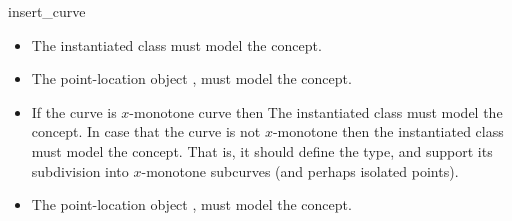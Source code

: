 \begin{ccRefFunction}{insert_curve}
\ccRequirements
\begin{itemize}
\item The instantiated  class must model the
   concept.
\item The point-location object , must model the
   concept.
\end{itemize}
			

\ccRequirements
\begin{itemize}
\item If the curve is $x$-monotone curve then The instantiated
   class must model the 
  concept. In case that the curve is not $x$-monotone then the
  instantiated  class must model the
   concept. That is, it should define the
   type, and support its subdivision into $x$-monotone
  subcurves (and perhaps isolated points). 
\item The point-location object , must model the
   concept.
\end{itemize}

\end{ccRefFunction}

\ccRefPageEnd
